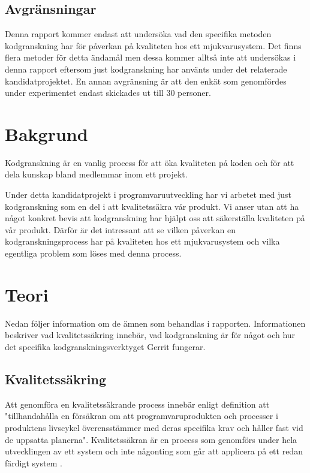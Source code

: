 \subsection{Avgränsningar}
Denna rapport kommer endast att undersöka vad den specifika metoden kodgranskning har för påverkan på kvaliteten hos ett mjukvarusystem. Det finns flera metoder för detta ändamål men dessa kommer alltså inte att undersökas i denna rapport eftersom just kodgranskning har använts under det relaterade kandidatprojektet. En annan avgränsning är att den enkät som genomfördes under experimentet endast skickades ut till 30 personer.

\section{Bakgrund}
\label{sec:background-wallstrom}

Kodgranskning är en vanlig process för att öka kvaliteten på koden och för att dela kunskap bland medlemmar inom ett projekt.

Under detta kandidatprojekt i programvaruutveckling har vi arbetet med just kodgranskning som en del i att kvalitetssäkra vår produkt. Vi anser utan att ha något konkret bevis att kodgranskning har hjälpt oss att säkerställa kvaliteten på vår produkt. Därför är det intressant att se vilken påverkan en kodgranskningsprocess har på kvaliteten hos ett mjukvarusystem och vilka egentliga problem som löses med denna process.

\section{Teori}
\label{sec:theory-wallstrom}
Nedan följer information om de ämnen som behandlas i rapporten. Informationen beskriver vad kvalitetssäkring innebär, vad kodgranskning är för något och hur det specifika kodgranskningsverktyget Gerrit fungerar.

\subsection{Kvalitetssäkring}
Att genomföra en kvalitetssäkrande process innebär enligt definition att "tillhandahålla en försäkran om att programvaruprodukten och processer i produktens livscykel överensstämmer med deras specifika krav och håller fast vid de uppsatta planerna". 
Kvalitetssäkran är en process som genomförs under hela utvecklingen av ett system och inte någonting som går att applicera på ett redan färdigt system \cite{feldman2005quality}.

